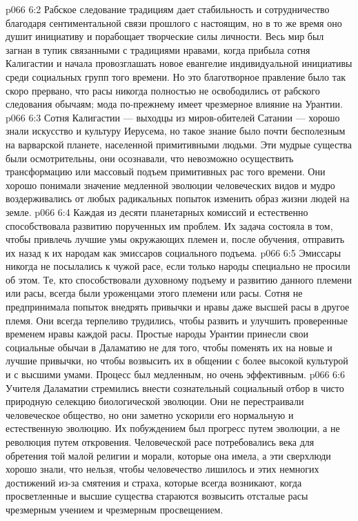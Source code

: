 \vs p066 6:2 Рабское следование традициям дает стабильность и сотрудничество благодаря сентиментальной связи прошлого с настоящим, но в то же время оно душит инициативу и порабощает творческие силы личности. Весь мир был загнан в тупик связанными с традициями нравами, когда прибыла сотня Калигастии и начала провозглашать новое евангелие индивидуальной инициативы среди социальных групп того времени. Но это благотворное правление было так скоро прервано, что расы никогда полностью не освободились от рабского следования обычаям; мода по\hyp{}прежнему имеет чрезмерное влияние на Урантии.
\vs p066 6:3 Сотня Калигастии --- выходцы из миров\hyp{}обителей Сатании --- хорошо знали искусство и культуру Иерусема, но такое знание было почти бесполезным на варварской планете, населенной примитивными людьми. Эти мудрые существа были осмотрительны, они осознавали, что невозможно осуществить  трансформацию или массовый подъем примитивных рас того времени. Они хорошо понимали значение медленной эволюции человеческих видов и мудро воздерживались от любых радикальных попыток изменить образ жизни людей на земле.
\vs p066 6:4 Каждая из десяти планетарных комиссий  и естественно способствовала развитию порученных им проблем. Их задача состояла в том, чтобы привлечь лучшие умы окружающих племен и, после обучения, отправить их назад к их народам как эмиссаров социального подъема.
\vs p066 6:5 Эмиссары никогда не посылались к чужой расе, если только народы специально не просили об этом. Те, кто способствовали духовному подъему и развитию данного племени или расы, всегда были уроженцами этого племени или расы. Сотня не предпринимала попыток внедрять привычки и нравы даже высшей расы в другое племя. Они всегда терпеливо трудились, чтобы развить и улучшить проверенные временем нравы каждой расы. Простые народы Урантии принесли свои социальные обычаи в Даламатию не для того, чтобы поменять их на новые и лучшие привычки, но чтобы возвысить их в общении с более высокой культурой и с высшими умами. Процесс был медленным, но очень эффективным.
\vs p066 6:6 Учителя Даламатии стремились внести сознательный социальный отбор в чисто природную селекцию биологической эволюции. Они не перестраивали человеческое общество, но они заметно ускорили его нормальную и естественную эволюцию. Их побуждением был прогресс путем эволюции, а не революция путем откровения. Человеческой расе потребовались века для обретения той малой религии и морали, которые она имела, а эти сверхлюди хорошо знали, что нельзя, чтобы человечество лишилось и этих немногих достижений из\hyp{}за смятения и страха, которые всегда возникают, когда просветленные и высшие существа стараются возвысить отсталые расы чрезмерным учением и чрезмерным просвещением.
